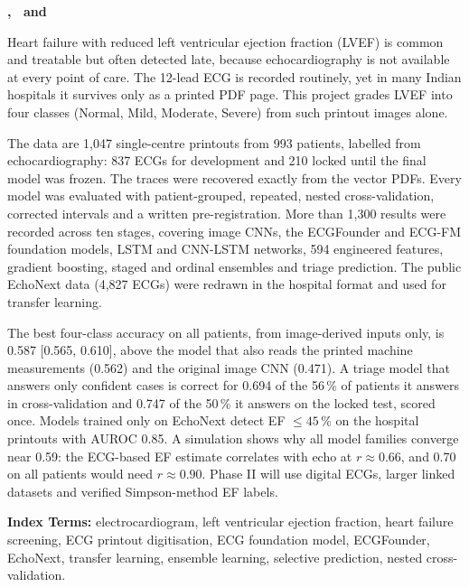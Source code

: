 \vspace{24pt}
\hfill\textbf{\StudentA, \StudentB\ and \StudentC}
\clearpage

\fancyhead[L]{}\fancyhead[R]{\thepage}
Heart failure with reduced left ventricular ejection fraction (LVEF) is common and treatable but often detected late, because echocardiography is not available at every point of care. The 12-lead ECG is recorded routinely, yet in many Indian hospitals it survives only as a printed PDF page. This project grades LVEF into four classes (Normal, Mild, Moderate, Severe) from such printout images alone.

The data are 1,047 single-centre printouts from 993 patients, labelled from echocardiography: 837 ECGs for development and 210 locked until the final model was frozen. The traces were recovered exactly from the vector PDFs. Every model was evaluated with patient-grouped, repeated, nested cross-validation, corrected intervals and a written pre-registration. More than 1,300 results were recorded across ten stages, covering image CNNs, the ECGFounder and ECG-FM foundation models, LSTM and CNN-LSTM networks, 594 engineered features, gradient boosting, staged and ordinal ensembles and triage prediction. The public EchoNext data (4,827 ECGs) were redrawn in the hospital format and used for transfer learning.

The best four-class accuracy on all patients, from image-derived inputs only, is 0.587 [0.565, 0.610], above the model that also reads the printed machine measurements (0.562) and the original image CNN (0.471). A triage model that answers only confident cases is correct for 0.694 of the 56\,\% of patients it answers in cross-validation and 0.747 of the 50\,\% it answers on the locked test, scored once. Models trained only on EchoNext detect EF $\le 45$\,\% on the hospital printouts with AUROC 0.85. A simulation shows why all model families converge near 0.59: the ECG-based EF estimate correlates with echo at $r\approx0.66$, and 0.70 on all patients would need $r\approx0.90$. Phase II will use digital ECGs, larger linked datasets and verified Simpson-method EF labels.

\textbf{Index Terms:} electrocardiogram, left ventricular ejection fraction, heart failure screening, ECG printout digitisation, ECG foundation model, ECGFounder, EchoNext, transfer learning, ensemble learning, selective prediction, nested cross-validation.
\clearpage
\fancyhead[L]{\nouppercase{\leftmark}}\fancyhead[R]{\thepage}

